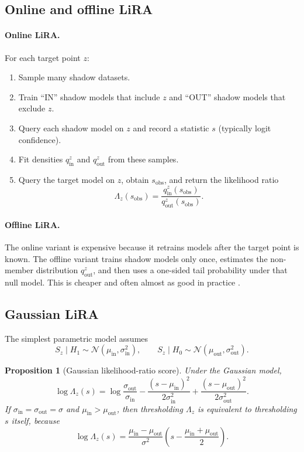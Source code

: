 \documentclass[11pt]{article}
\newtheorem{proposition}[theorem]{Proposition}
\theoremstyle{definition}
\newcommand{\1}{\mathbf{1}}
\begin{document}
\subsection{Online and offline LiRA}

\paragraph{Online LiRA.}
For each target point $z$:
\begin{enumerate}
    \item Sample many shadow datasets.
    \item Train ``IN'' shadow models that include $z$ and ``OUT'' shadow models that exclude $z$.
    \item Query each shadow model on $z$ and record a statistic $s$ (typically logit confidence).
    \item Fit densities $q_{\mathrm{in}}^z$ and $q_{\mathrm{out}}^z$ from these samples.
    \item Query the target model on $z$, obtain $s_{\mathrm{obs}}$, and return the likelihood ratio
    \[
    \Lambda_z(s_{\mathrm{obs}}) = \frac{q_{\mathrm{in}}^z(s_{\mathrm{obs}})}{q_{\mathrm{out}}^z(s_{\mathrm{obs}})}.
    \]
\end{enumerate}

\paragraph{Offline LiRA.}
The online variant is expensive because it retrains models after the target point is known. The offline variant trains shadow models only once, estimates the non-member distribution $q_{\mathrm{out}}^z$, and then uses a one-sided tail probability under that null model. This is cheaper and often almost as good in practice \cite{carlini2022}.

\subsection{Gaussian LiRA}

The simplest parametric model assumes
\[
S_z \mid H_1 \sim \mathcal{N}(\mu_{\mathrm{in}},\sigma_{\mathrm{in}}^2),
\qquad
S_z \mid H_0 \sim \mathcal{N}(\mu_{\mathrm{out}},\sigma_{\mathrm{out}}^2).
\]

\begin{proposition}[Gaussian likelihood-ratio score]\label{prop:lira-gaussian}
Under the Gaussian model,
\[
\log \Lambda_z(s)
= \log\frac{\sigma_{\mathrm{out}}}{\sigma_{\mathrm{in}}}
- \frac{(s-\mu_{\mathrm{in}})^2}{2\sigma_{\mathrm{in}}^2}
+ \frac{(s-\mu_{\mathrm{out}})^2}{2\sigma_{\mathrm{out}}^2}.
\]
If $\sigma_{\mathrm{in}} = \sigma_{\mathrm{out}} = \sigma$ and $\mu_{\mathrm{in}} > \mu_{\mathrm{out}}$, then thresholding $\Lambda_z$ is equivalent to thresholding $s$ itself, because
\[
\log \Lambda_z(s)
= \frac{\mu_{\mathrm{in}} - \mu_{\mathrm{out}}}{\sigma^2}
\left(s - \frac{\mu_{\mathrm{in}}+\mu_{\mathrm{out}}}{2}\right).
\]
\end{proposition}
\end{document}
